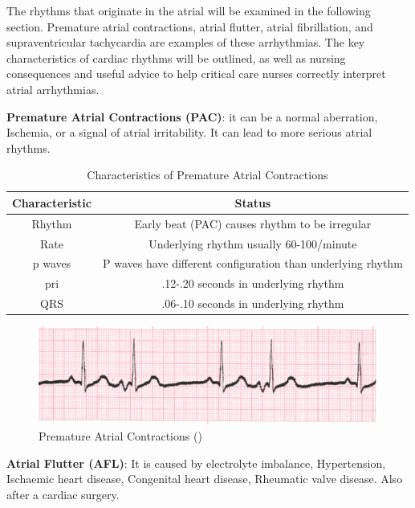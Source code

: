 The rhythms that originate in the atrial will be examined in the following section. Premature atrial contractions, atrial flutter, atrial fibrillation, and supraventricular tachycardia are examples of these arrhythmias. The key characteristics of cardiac rhythms will be outlined, as well as nursing consequences and useful advice to help critical care nurses correctly interpret atrial arrhythmias.

\textbf{Premature Atrial Contractions (PAC)}: it can be a normal aberration,
Ischemia,  or a signal of atrial irritability. It can lead to more serious atrial rhythms.

\begin{table}[H]
\begin{center}
\begin{tabular}{||c || c||}
 \hline
\textbf{Characteristic} & \textbf{Status} \\ [0.4ex] 
 \hline\hline
 Rhythm & Early beat (PAC) causes rhythm to be irregular \\
\hline
Rate & Underlying rhythm usually 60-100/minute\\
\hline
p waves & P waves have different configuration than underlying rhythm \\
\hline
pri & .12-.20 seconds in underlying rhythm \\
\hline
QRS & .06-.10 seconds in underlying rhythm \\
\hline\hline
\end{tabular}
\end{center}
\caption{Characteristics of Premature Atrial Contractions}
\label{table:PAC_characteristics}
\end{table}

 \begin{figure}[H]
\centering
\includegraphics[scale=0.9]{img/PAC.png}
\caption{Premature Atrial Contractions (\cite{arryth_types})}
\label{fig:PAC}
\end{figure}

\textbf{Atrial Flutter (AFL)}: It is caused by electrolyte imbalance, Hypertension, Ischaemic heart disease, Congenital heart disease, Rheumatic valve disease. Also after a cardiac surgery.

